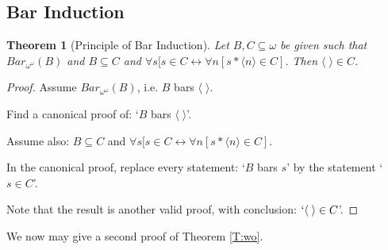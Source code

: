 \documentclass[a4paper]{amsart}
\theoremstyle{plain}
\newtheorem{theorem}{Theorem}
\begin{document}
 \subsection{Bar Induction} \begin{theorem}[Principle of Bar Induction]\label{T:barinduction} Let $B,C\subseteq \omega$ be given such that $Bar_{\omega^\omega}(B)$ and $B\subseteq C$ and $\forall s[s\in C\leftrightarrow \forall n[s\ast\langle n \rangle \in C]$. Then $\langle\;\rangle \in C$. \end{theorem}
 \begin{proof} Assume $Bar_{\omega^\omega}(B)$, i.e. $B$ bars $\langle\;\rangle$.
 
 Find a canonical proof of: `$B$ bars $\langle\;\rangle$'.
 
 Assume also: $B\subseteq C$ and $\forall s[s\in C\leftrightarrow \forall n[s\ast\langle n \rangle \in C]$. 
 
 In the canonical proof, replace every statement: `$B$ bars $s$' by the statement `$s \in C$'. 
 
 Note that the result is another valid proof, with conclusion: $`\langle\;\rangle \in C$'. \end{proof}
 
 We now may give a second proof of Theorem \ref{T:wo}. 
 
\end{document}

